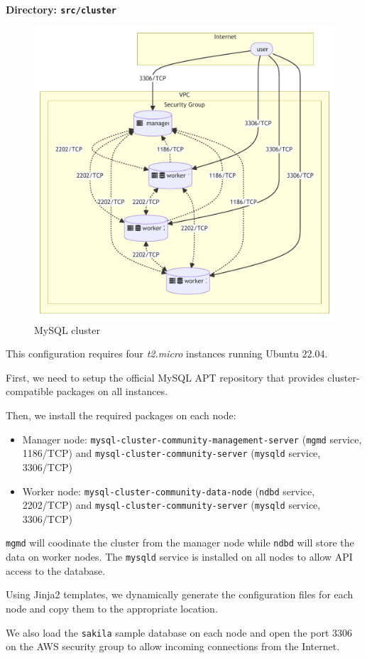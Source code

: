\documentclass[letterpaper,headings=standardclasses,parskip=half]{scrartcl}
\begin{document}
\textbf{Directory: \texttt{src/cluster}}

\begin{figure}[h]
    \centering
    \includegraphics[width=0.75\linewidth]{figures/cluster.mmd.pdf}
    \caption{MySQL cluster}
    \label{fig:cluster}
\end{figure}

This configuration requires four \textit{t2.micro} instances running Ubuntu 22.04.

First, we need to setup the official MySQL APT repository that provides cluster-compatible packages on all instances.

Then, we install the required packages on each node:
\begin{itemize}
    \item Manager node: \texttt{mysql-cluster-community-management-server} (\texttt{mgmd} service, 1186/TCP) and \texttt{mysql-cluster-community-server} (\texttt{mysqld} service, 3306/TCP)
    \item Worker node: \texttt{mysql-cluster-community-data-node} (\texttt{ndbd} service, 2202/TCP) and \texttt{mysql-cluster-community-server} (\texttt{mysqld} service, 3306/TCP)
\end{itemize}
\texttt{mgmd} will coodinate the cluster from the manager node while \texttt{ndbd} will store the data on worker nodes. The \texttt{mysqld} service is installed on all nodes to allow API access to the database.

Using Jinja2 templates, we dynamically generate the configuration files for each node and copy them to the appropriate location.

We also load the \texttt{sakila} sample database on each node and open the port 3306 on the AWS security group to allow incoming connections from the Internet.
\end{document}
